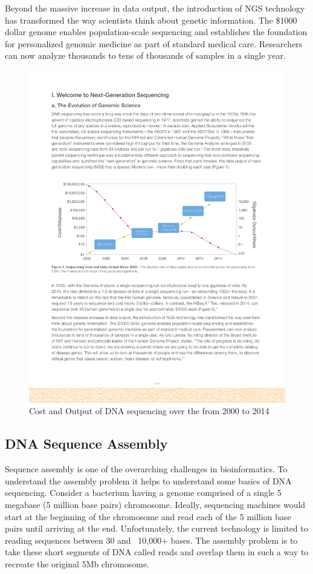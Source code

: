 \documentclass{bioinfo}
\begin{document}
Beyond the massive increase in data output, the introduction of NGS technology has transformed the way scientists think about genetic information. The \$1000 dollar genome enables population-scale sequencing and establishes the foundation for personalized genomic medicine as part of standard medical care. Researchers can now analyze thousands to tens of thousands of samples in a single year. 

\begin{figure}
\includegraphics[width = \linewidth]{cost}	
\caption{Cost and Output of DNA sequencing over the from 2000 to 2014}
\end{figure}

\subsection{DNA Sequence Assembly}

Sequence assembly is one of the overarching challenges in bioinformatics.  To understand the assembly problem it helps to understand some basics of DNA sequencing.  Consider a bacterium having a genome comprised of a single 5 megabase (5 million base pairs) chromosome.  Ideally, sequencing machines would start at the beginning of the chromosome and read each of the 5 million base pairs until arriving at the end.  Unfortunately, the current technology is limited to reading sequences between 30 and ~10,000+ bases.  The assembly problem is to take these short segments of DNA called reads and overlap them in such a way to recreate the original 5Mb chromosome.
\end{document}
